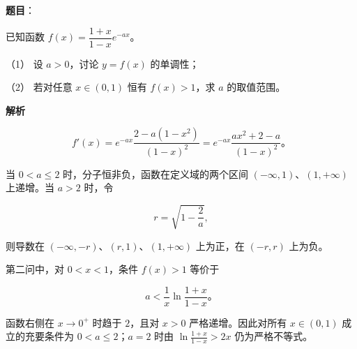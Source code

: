 \begin{answer}

\textbf{题目}：

已知函数 $f(x)=\dfrac{1+x}{1-x}e^{-ax}$。

（1） 设 $a>0$，讨论 $y=f(x)$ 的单调性；

（2） 若对任意 $x\in(0,1)$ 恒有 $f(x)>1$，求 $a$ 的取值范围。

\textbf{解析}


\nopagebreak[4]
\[
f'(x)=e^{-ax}\frac{2-a(1-x^2)}{(1-x)^2}=e^{-ax}\frac{ax^2+2-a}{(1-x)^2}\text{。}
\]

当 $0<a\leqslant2$ 时，分子恒非负，函数在定义域的两个区间 $(-\infty,1)$、$(1,+\infty)$ 上递增。当 $a>2$ 时，令

\nopagebreak[4]
\[
r=\sqrt{1-\frac2a},
\]

则导数在 $(-\infty,-r)$、$(r,1)$、$(1,+\infty)$ 上为正，在 $(-r,r)$ 上为负。


第二问中，对 $0<x<1$，条件 $f(x)>1$ 等价于

\nopagebreak[4]
\[
a<\frac1x\ln\frac{1+x}{1-x}\text{。}
\]

函数右侧在 $x\to0^+$ 时趋于 $2$，且对 $x>0$ 严格递增。因此对所有 $x\in(0,1)$ 成立的充要条件为 $0<a\leqslant2$；$a=2$ 时由 $\ln\frac{1+x}{1-x}>2x$ 仍为严格不等式。



\end{answer}
